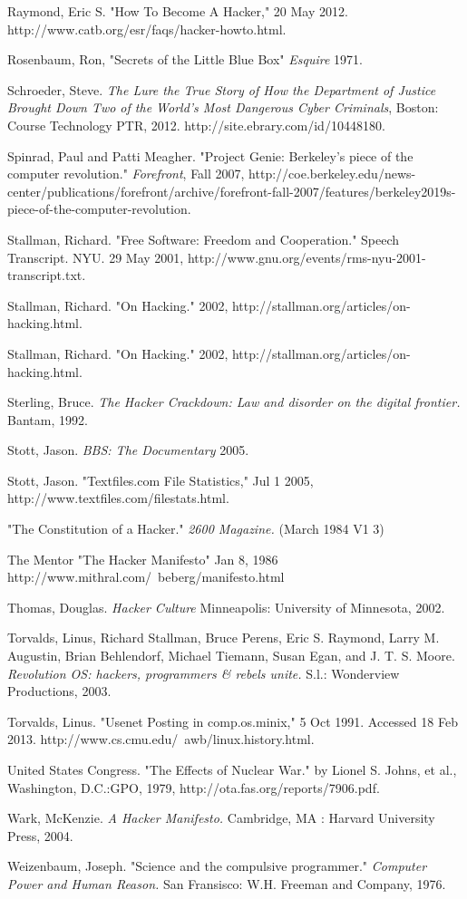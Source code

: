 \documentclass[11pt]{article}
\begin{document}
\begin{hangparas}{15pt}{1}
Raymond, Eric S. "How To Become A Hacker," 20 May 2012. http://www.catb.org/esr/faqs/hacker-howto.html.

Rosenbaum, Ron, "Secrets of the Little Blue Box" \emph{Esquire} 1971.

Schroeder, Steve. \emph{The Lure the True Story of How the Department of Justice Brought Down Two of the World's Most Dangerous Cyber Criminals}, Boston: Course Technology PTR, 2012. http://site.ebrary.com/id/10448180.

Spinrad, Paul and Patti Meagher. "Project Genie: Berkeley’s piece of the computer revolution." \emph{Forefront}, Fall 2007, http://coe.berkeley.edu/news-center/publications/forefront/archive/forefront-fall-2007/features/berkeley2019s-piece-of-the-computer-revolution.

Stallman, Richard. "Free Software: Freedom and Cooperation." Speech Transcript. NYU. 29 May 2001, http://www.gnu.org/events/rms-nyu-2001-transcript.txt.

Stallman, Richard. "On Hacking." 2002, http://stallman.org/articles/on-hacking.html.

Stallman, Richard. "On Hacking." 2002, http://stallman.org/articles/on-hacking.html.

Sterling, Bruce. \emph{The Hacker Crackdown: Law and disorder on the digital frontier.} Bantam, 1992.

Stott, Jason. \emph{BBS: The Documentary} 2005.

Stott, Jason. "Textfiles.com File Statistics," Jul 1 2005, http://www.textfiles.com/filestats.html.

"The Constitution of a Hacker." \emph{2600 Magazine.} (March 1984 V1 3)

The Mentor "The Hacker Manifesto" Jan 8, 1986 http://www.mithral.com/~beberg/manifesto.html

Thomas, Douglas. \emph{Hacker Culture} Minneapolis: University of Minnesota, 2002.

Torvalds, Linus, Richard Stallman, Bruce Perens, Eric S. Raymond, Larry M. Augustin, Brian Behlendorf, Michael Tiemann, Susan Egan, and J. T. S. Moore. \emph{Revolution OS: hackers, programmers \& rebels unite.} S.l.: Wonderview Productions, 2003.

Torvalds, Linus. "Usenet Posting in comp.os.minix," 5 Oct 1991. Accessed 18 Feb 2013. http://www.cs.cmu.edu/~awb/linux.history.html.

United States Congress. "The Effects of Nuclear War." by Lionel S. Johns, et al., Washington, D.C.:GPO, 1979, http://ota.fas.org/reports/7906.pdf.

Wark, McKenzie. \emph{A Hacker Manifesto.} Cambridge, MA : Harvard University Press, 2004.

Weizenbaum, Joseph. "Science and the compulsive programmer." \emph{Computer Power and Human Reason.} San Fransisco: W.H. Freeman and Company, 1976.
\end{hangparas}
\end{document}
